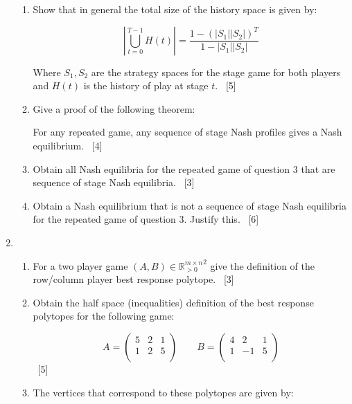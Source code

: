 \documentclass[12pt,a4paper]{article}
\begin{document}
\begin{enumerate}
\begin{enumerate}
        \item Show that in general the total size of the history space is given
            by:

            \[
                \left|\bigcup_{t=0}^{T-1}H(t)\right| = \frac{1 - (|S_1||S_2|)^T}{1 - |S_1||S_2|}
            \]

            Where \(S_1, S_2\) are the strategy spaces for the stage game for
            both players and \(H(t)\) is the history of play at stage \(t\).
            ~\hfill{[5]}


        \item Give a proof of the following theorem:

            For any repeated game, any sequence of stage Nash profiles gives a
            Nash equilibrium.
            ~\hfill{[4]}

        \item Obtain all Nash equilibria for the repeated game of question 3
            that are sequence
            of stage Nash equilibria.
            ~\hfill{[3]}

        \item Obtain a Nash equilibrium that is not a sequence of stage Nash
            equilibria for the repeated game of question 3. Justify this.
            ~\hfill{[6]}


    \end{enumerate}

\newpage
\item

    \begin{enumerate}
        \item For a two player game $(A, B)\in{\mathbb{R}^{m\times n}_{>0}}^2$
            give the definition of the row/column player best response polytope.
            ~\hfill{[3]}
        \item Obtain the half space (inequalities) definition of the best
            response polytopes for the following game:

            \[
                A = \begin{pmatrix}
                    5 & 2 & 1\\
                    1 & 2 & 5\\
                    \end{pmatrix}
                \qquad
                B = \begin{pmatrix}
                    4 & 2  & 1\\
                    1 & -1 & 5\\
                    \end{pmatrix}
            \]
            ~\hfill{[5]}
         \item The vertices that correspond to these polytopes are given by:


\end{enumerate}
\end{enumerate}
\end{document}
